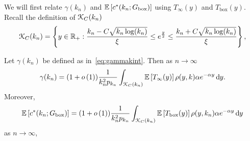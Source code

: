 We will first relate $\gamma(k_n)$ and $\mathbb{E}\left[c^\ast(k_n; G_{\mathrm{box}})\right]$ using $T_\infty(y)$ and $T_{\text{box}}(y)$. Recall the definition of ${\mathcal K}_{C}(k_n)$
\[
	{\mathcal K}_C(k_n) = \left\{y \in {\ensuremath{\mathbb R}}_+ : \frac{k_n - C \sqrt{k_n \log(k_n)}}{\xi} \le e^{\frac{y}{2}}
	\le \frac{k_n + C \sqrt{k_n \log(k_n)}}{\xi} \right\},	
\]

\begin{lemma}
Let $\gamma(k_n)$ be defined as in~\eqref{eq:gammakint}. Then as $n \to \infty$
\begin{equation}\label{eq:alt_gamma_kn}
	\gamma(k_n) = (1+o\left(1\right))\frac{1}{k_n^2 p_{k_n}} \int_{{\mathcal K}_{C}(k_n)} \mathbb{E}\left[T_\infty(y)\right] \rho(y,k) 
				\alpha e^{-\alpha y} \operatorname{\mathrm{d}\hspace{-2pt}} y. 
\end{equation}
Moreover,
\begin{equation}\label{eq:alt_c_ast_kn}
	\mathbb{E}\left[c^\ast(k_n;G_{\mathrm{box}})\right] = (1 + o\left(1\right)) \frac{1}{k_n^2 p_{k_n}} \int_{{\mathcal K}_{C}(k_n)} \mathbb{E}\left[T_{\text{box}}(y)\right]
		\rho(y,k_n) \alpha e^{-\alpha y} \operatorname{\mathrm{d}\hspace{-2pt}} y
\end{equation}
as $n \to \infty$,
\end{lemma}

